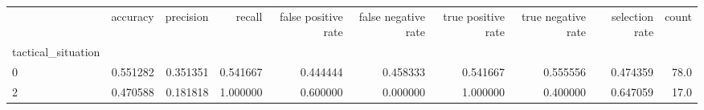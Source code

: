 \begin{tabular}{lrrrrrrrrr}
\toprule
{} &  accuracy &  precision &    recall &  false positive rate &  false negative rate &  true positive rate &  true negative rate &  selection rate &  count \\
tactical\_situation &           &            &           &                      &                      &                     &                     &                 &        \\
\midrule
0                  &  0.551282 &   0.351351 &  0.541667 &             0.444444 &             0.458333 &            0.541667 &            0.555556 &        0.474359 &   78.0 \\
2                  &  0.470588 &   0.181818 &  1.000000 &             0.600000 &             0.000000 &            1.000000 &            0.400000 &        0.647059 &   17.0 \\
\bottomrule
\end{tabular}
